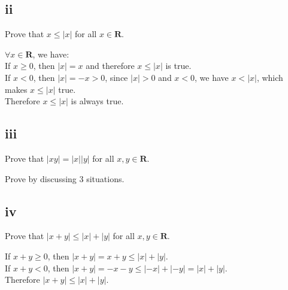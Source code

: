 \documentclass{article}
\begin{document}
\subsection*{ii}
Prove that $x \leq |x|$ for all $x \in \mathbf{R}$.
\begin{addmargin}[1em]{0em}
    $\forall x \in \mathbf{R}$, we have:\\
    If $x \geq 0$, then $|x| = x$ and therefore $x \leq |x|$ is true.\\
    If $x < 0$, then $|x| = -x > 0$, since $|x| > 0$ and $x < 0$, we have $x < |x|$, which makes $x \leq |x|$ true.\\
    Therefore $x \leq |x|$ is always true.
\end{addmargin}
\subsection*{iii}
Prove that $|xy| = |x||y|$ for all $x, y \in \mathbf{R}$.
\begin{addmargin}[1em]{0em}
    Prove by discussing 3 situations.
\end{addmargin}
\subsection*{iv}
Prove that $|x + y| \leq |x| + |y|$ for all $x, y \in \mathbf{R}$.
\begin{addmargin}[1em]{0em}
    If $x + y \geq 0$, then $|x+y| = x+y \leq |x| + |y|$.\\
    If $x + y < 0$, then $|x+y| = -x - y \leq |-x| + |-y| = |x| + |y|$.\\
    Therefore $|x + y| \leq |x| + |y|$.
\end{addmargin}
\end{document}
